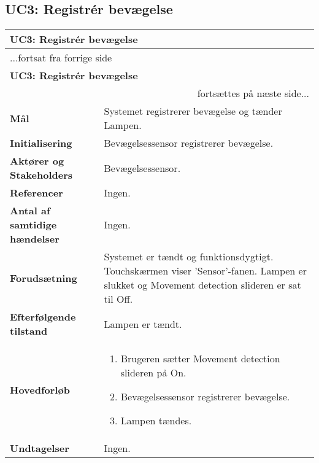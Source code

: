 \subsection{UC3: Registrér bevægelse}

\begin{center} \centering
	\begin{longtable}{|p{6cm}|p{8cm}|}
	\hline
		\multicolumn{2}{|l|}{\textbf{UC3: Registrér bevægelse}} \\\hline
		\endfirsthead
		
		\multicolumn{2}{l}{...fortsat fra forrige side} \\ \hline 
		\multicolumn{2}{|l|}{\textbf{UC3: Registrér bevægelse}} \\\hline
		\endhead		

        \multicolumn{2}{r}{fortsættes på næste side...} \\
        \endfoot
        \endlastfoot
        
        \textbf{Mål}								
            & Systemet registrerer bevægelse og tænder Lampen.
        \\ \hline
        \textbf{Initialisering}					
            & Bevægelsessensor registrerer bevægelse.
        \\ \hline
        \textbf{Aktører og Stakeholders}			
            & Bevægelsessensor.
        \\ \hline
        \textbf{Referencer}						
            & Ingen.
        \\ \hline
        \textbf{Antal af samtidige hændelser}	
            & Ingen.
        \\ \hline
        \textbf{Forudsætning}					
            & Systemet er tændt og funktionsdygtigt. Touchskærmen viser 'Sensor'-fanen. Lampen er slukket og Movement detection slideren er sat til Off.
        \\ \hline
        \textbf{Efterfølgende tilstand}			
            & Lampen er tændt.
        \\ \hline
        \textbf{Hovedforløb}						
            &
            \begin{enumerate}
                \item Brugeren sætter Movement detection slideren på On.
                \item Bevægelsessensor registrerer bevægelse.
                \item Lampen tændes.
            \end{enumerate} 
        \\ \hline
        \textbf{Undtagelser}						
            & Ingen.
        \\ \hline
	\end{longtable}
	\label{UC3} 
\end{center}